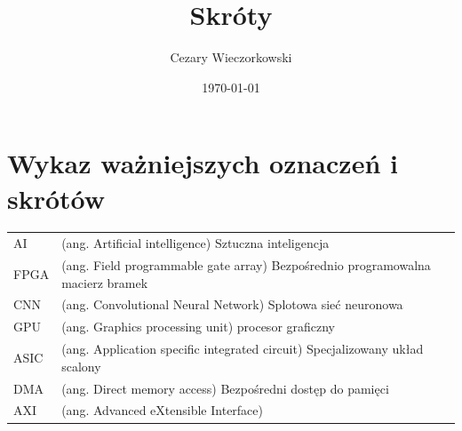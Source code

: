 \documentclass[./main.tex]{subfiles}
\author{Cezary Wieczorkowski}
\date{\today}
\title{Skróty}
\begin{document}
\section*{Wykaz ważniejszych oznaczeń i skrótów}

\begin{tabular}{l p{}}
AI & (ang. Artificial intelligence) Sztuczna inteligencja\\[0pt]
FPGA & (ang. Field programmable gate array) Bezpośrednio programowalna macierz bramek\\[0pt]
CNN & (ang. Convolutional Neural Network) Splotowa sieć neuronowa\\[0pt]
GPU & (ang. Graphics processing unit) procesor graficzny\\[0pt]
ASIC & (ang. Application specific integrated circuit) Specjalizowany układ scalony\\[0pt]
DMA & (ang. Direct memory access) Bezpośredni dostęp do pamięci\\[0pt]
AXI & (ang. Advanced eXtensible Interface)\\[0pt]
\end{tabular}
\end{document}
